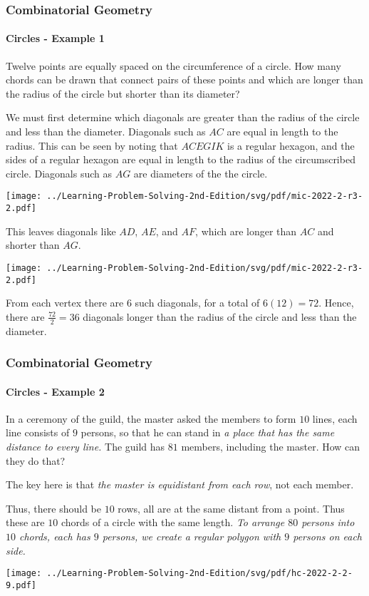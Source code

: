 \documentclass[8pt,xcolor=table,dvipsnames]{beamer}
\begin{document}
\begin{frame}[t]
    \frametitle{Combinatorial Geometry}
    \framesubtitle{Circles - Example 1}
    \begin{example}[MIC-2022-SM2-R3-J2]
        Twelve points are equally spaced on the circumference of a circle.
        How many chords can be drawn that connect pairs of these points
        and which are longer than the radius of the circle but shorter than its diameter?  
    \end{example}
    \begin{overprint}
        We must first determine which diagonals are greater than the radius of the circle and less than the diameter.
        Diagonals such as $AC$ are equal in length to the radius.
        This can be seen by noting that $ACEGIK$ is a regular hexagon,
        and the sides of a regular hexagon are equal in length to the radius of the circumscribed circle.
        Diagonals such as $AG$ are diameters of the the circle.
        \begin{center}
            \texttt{[image: ../Learning-Problem-Solving-2nd-Edition/svg/pdf/mic-2022-2-r3-2.pdf]}
        \end{center}
        This leaves diagonals like $AD$, $AE$, and $AF$, which are longer than $AC$ and shorter than $AG$.
        \begin{center}
            \texttt{[image: ../Learning-Problem-Solving-2nd-Edition/svg/pdf/mic-2022-2-r3-2.pdf]}
        \end{center}
        From each vertex there are $6$ such diagonals, for a total of $6(12)=72$.
        Hence, there are $\frac{72}{2}=\boxed{36}$ diagonals longer than the radius of the circle
        and less than the diameter. 
    \end{overprint}
\end{frame}

\begin{frame}[t]
    \frametitle{Combinatorial Geometry}
    \framesubtitle{Circles - Example 2}
    \begin{example}[HC-2022-SM2-R2-P9]
        In a ceremony of the guild, the master asked the members to form $10$ lines,
        each line consists of $9$ persons, so that he can stand in \textit{a place that has the same distance to every line.}    
        The guild has $81$ members, including the master.
        How can they do that?
    \end{example}
    The key here is that \textit{the master is equidistant from each row}, not each member.
    
    Thus, there should be $10$ rows, all are at the same distant from a point.
    Thus these are $10$ chords of a circle with the same length.
    \textit{To arrange $80$ persons into $10$ chords, each has $9$ persons, 
    we create a regular polygon with $9$ persons on each side.}
    \begin{center}
        \texttt{[image: ../Learning-Problem-Solving-2nd-Edition/svg/pdf/hc-2022-2-2-9.pdf]}
    \end{center}
\end{frame}
\end{document}
